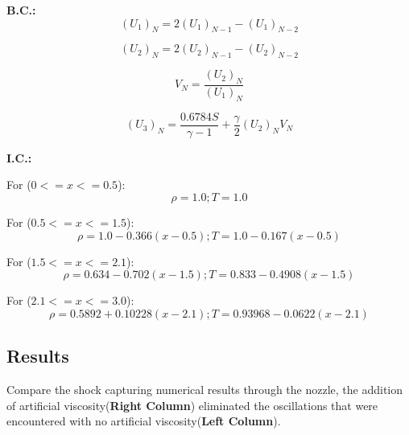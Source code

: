 \textbf{B.C.:}
\begin{equation}
(U_1)_N = 2(U_1)_{N-1} - (U_1)_{N-2}
\end{equation}

\begin{equation}
(U_2)_N = 2(U_2)_{N-1} - (U_2)_{N-2}
\end{equation}

\begin{equation}
V_N = \frac{(U_2)_N}{(U_1)_N}
\end{equation}

\begin{equation}
(U_3)_N = \frac{0.6784 S}{\gamma -1} + \frac{\gamma}{2}(U_2)_N V_N
\end{equation}

\textbf{I.C.:}

For ($0<=x<=0.5$):
\begin{equation}
\rho = 1.0; T =1.0
\end{equation}

For ($0.5<=x<=1.5$):
\begin{equation}
\rho = 1.0-0.366(x-0.5); T =1.0-0.167(x-0.5)
\end{equation}

For ($1.5<=x<=2.1$):
\begin{equation}
\rho = 0.634-0.702(x-1.5); T =0.833-0.4908(x-1.5)
\end{equation}

For ($2.1<=x<=3.0$):
\begin{equation}
\rho = 0.5892+0.10228(x-2.1); T =0.93968-0.0622(x-2.1)
\end{equation}

\subsection{Results}
Compare the shock capturing numerical results through the nozzle, the addition of artificial viscosity(\textbf{Right Column}) eliminated the oscillations that were encountered with no artificial viscosity(\textbf{Left Column}).


